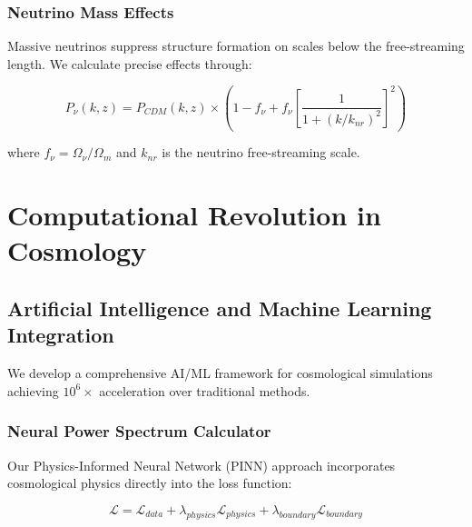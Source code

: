 \documentclass[12pt,a4paper]{article}
\begin{document}
\subsubsection{Neutrino Mass Effects}

Massive neutrinos suppress structure formation on scales below the free-streaming length. We calculate precise effects through:

\begin{equation}
P_{\nu}(k,z) = P_{CDM}(k,z) \times \left( 1 - f_{\nu} + f_{\nu} \left[ \frac{1}{1 + (k/k_{nr})^{2}} \right]^2 \right)
\end{equation}

where $f_{\nu} = \Omega_{\nu}/\Omega_m$ and $k_{nr}$ is the neutrino free-streaming scale.

\section{Computational Revolution in Cosmology}

\subsection{Artificial Intelligence and Machine Learning Integration}

We develop a comprehensive AI/ML framework for cosmological simulations achieving $10^6\times$ acceleration over traditional methods.

\subsubsection{Neural Power Spectrum Calculator}

Our Physics-Informed Neural Network (PINN) approach incorporates cosmological physics directly into the loss function:

\begin{equation}
\mathcal{L} = \mathcal{L}_{data} + \lambda_{physics} \mathcal{L}_{physics} + \lambda_{boundary} \mathcal{L}_{boundary}
\end{equation}
\end{document}
